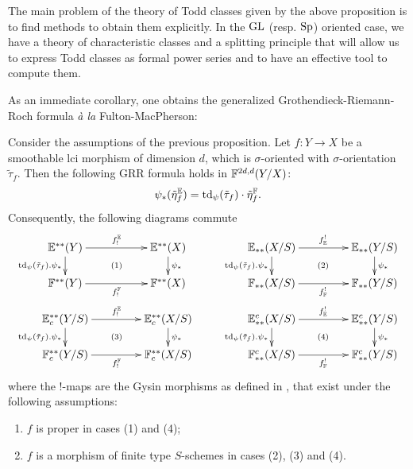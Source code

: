 \begin{rem}
The main problem of the theory of Todd classes given by the above proposition
 is to find methods to obtain them explicitly. In the $\mathrm{GL}$ (resp. $\mathrm{Sp}$) oriented case,
 we have a theory of characteristic classes and a splitting principle
 that will allow us to express Todd classes as formal power series and to have
 an effective tool to compute them.
\end{rem}

As an immediate corollary, one obtains the generalized
 Grothendieck-Riemann-Roch formula \emph{à la} Fulton-MacPherson:
\begin{thm}\label{thm:GRR}
Consider the assumptions of the previous proposition.
 Let $f:Y \rightarrow X$ be a smoothable lci morphism of dimension $d$,
 which is $\sigma$-oriented with $\sigma$-orientation $\tilde \tau_f$. Then the following GRR formula holds in $\mathbb F^{2d,d}(Y/X)$:
$$
\psi_*(\tilde\eta_f^\mathbb E)=\operatorname{td}_\psi(\tilde \tau_f)\cdot\tilde\eta_f^\mathbb F.
$$
Consequently, the following diagrams commute
\[
\xymatrix@=16pt@C=44pt{
\E^{**}(Y)\ar^{f_!^\E}[r]\ar_{\td_\psi(\tilde \tau_f).\psi_*}[d]\ar@{}|{(1)}[rd] & \E^{**}(X)\ar^{\psi_*}[d] 
 & \E_{**}(X/S)\ar^{f^!_\E}[r]\ar_{\td_\psi(\tilde \tau_f).\psi_*}[d]\ar@{}|{(2)}[rd] & \E_{**}(Y/S)\ar^{\psi_*}[d] \\
\F^{**}(Y)\ar_{f_!^\F}[r] & \F^{**}(X)
 & \F_{**}(X/S)\ar_{f^!_\F}[r] & \F_{**}(Y/S) \\
\E^{**}_c(Y/S)\ar^{f_!^\E}[r]\ar_{\td_\psi(\tilde \tau_f).\psi_*}[d]\ar@{}|{(3)}[rd] & \E^{**}_c(X/S)\ar^{\psi_*}[d]
 & \E_{**}^c(X/S)\ar^{f^!_\E}[r]\ar_{\td_\psi(\tilde \tau_f).\psi_*}[d]\ar@{}|{(4)}[rd] & \E_{**}^c(Y/S)\ar^{\psi_*}[d] \\
\F^{**}_c(Y/S)\ar_{f_!^\F}[r] & \F^{**}_c(X/S)
 & \F_{**}^c(X/S)\ar_{f^!_\F}[r] & \F_{**}^c(Y/S) 
}
\]
where the $!$-maps are the Gysin morphisms as defined in ,
that exist under the following assumptions:
\begin{enumerate}
\item[(a)] $f$ is proper in cases (1) and (4);
\item[(b)] $f$ is a morphism of finite type $S$-schemes in cases (2), (3) and (4).
\end{enumerate}
\end{thm}

